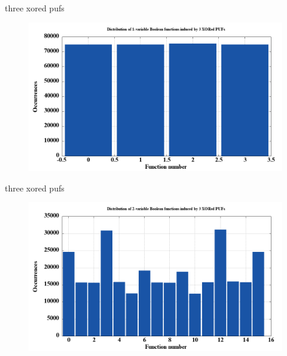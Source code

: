 \documentclass[10pt, compress]{beamer}
\begin{document}
\begin{frame}{three xored pufs}
    \begin{figure}
        \centering
        \includegraphics[width=\textwidth]{figures/dist/distribution_of_1-variable_boolean_functions_induced_by_3_xored_pufs.png}
    \end{figure}
\end{frame}

\begin{frame}{three xored pufs}
    \begin{figure}
        \centering
        \includegraphics[width=\textwidth]{figures/dist/distribution_of_2-variable_boolean_functions_induced_by_3_xored_pufs.png}
    \end{figure}
\end{frame}
\end{document}
